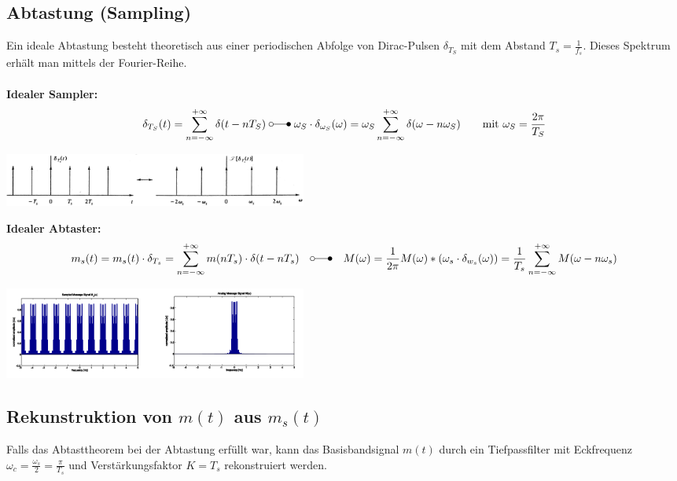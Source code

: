 \subsection{Abtastung (Sampling) }
	Ein ideale Abtastung besteht theoretisch aus einer periodischen Abfolge von Dirac-Pulsen
	$\delta_{T_S}$ mit dem Abstand $T_s = \frac{1}{f_s}$. Dieses Spektrum erhält man mittels der Fourier-Reihe. \\ \\
	\textbf{Idealer Sampler:}
	$$\delta_{T_S}(t) = \sum\limits_{n=-\infty}^{+\infty} \delta(t-nT_S) \; \laplace \; \omega_S \cdot \delta_{\omega_S} (\omega) = \omega_S \sum\limits_{n=-\infty}^{+\infty} \delta(\omega - n \omega_S) \qquad \text{mit  } \omega_S = \frac{2\pi}{T_S}$$
	\begin{center}
		\includegraphics[width=10cm]{bilder/dig_sampler_ideal.png}
	\end{center}

	\textbf{Idealer Abtaster:}
	\begin{equation*}
		 m_s(t) = m_s(t) \cdot \delta_{T_s} = \sum_{n=-\infty}^{+\infty} m(nT_s) \cdot \delta(t-nT_s) \quad \laplace \quad
		M(\omega) = \frac{1}{2\pi}M(\omega)\ast (\omega_s\cdot\delta_{w_s}(\omega)) = \frac{1}{T_s} \sum_{n=-\infty}^{+\infty}M(\omega-n\omega_s)
	\end{equation*}
	\begin{center}
			\includegraphics[width=10cm]{bilder/dig_abtaster_ideal_spektrum.png}
		\end{center}
\subsection{Rekunstruktion von $m(t)$ aus $m_s(t)$}
Falls das Abtasttheorem bei der Abtastung erf\"ullt war, kann das Basisbandsignal $m(t)$ durch ein Tiefpassfilter mit Eckfrequenz $\omega_c = \frac{\omega_s}{2} = \frac{\pi}{T_s} $ und Verst\"arkungsfaktor $K=T_s$ rekonstruiert werden.  

